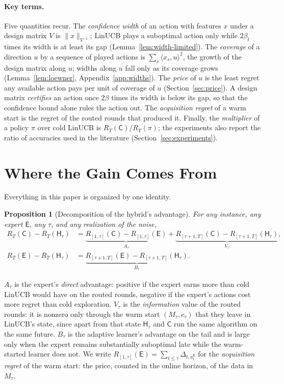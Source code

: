\documentclass{article}
\newtheorem{proposition}{Proposition}
\theoremstyle{definition}
\theoremstyle{remark}
\theoremstyle{remark}
\newcommand{\Cold}{\mathsf{C}}
\newcommand{\Exp}{\mathsf{E}}
\newcommand{\Hyb}{\mathsf{H}}
\begin{document}
\paragraph{Key terms.}
Five quantities recur. The \emph{confidence width} of an action with features
$x$ under a design matrix $V$ is $\|x\|_{V^{-1}}$; LinUCB plays a suboptimal
action only while $2\beta_t$ times its width is at least its gap
(Lemma~\ref{lem:width-limited}). The \emph{coverage} of a direction $u$ by a
sequence of played actions is $\sum_s\langle x_s,u\rangle^2$, the growth of the
design matrix along $u$; widths along $u$ fall only as its coverage grows
(Lemma~\ref{lem:loewner}, Appendix~\ref{app:widths}). The \emph{price} of $u$
is the least regret any available action pays per unit of coverage of $u$
(Section~\ref{sec:price}). A design
matrix \emph{certifies} an action once $2\beta$ times its width is below its
gap, so that the confidence bound alone rules the action out. The
\emph{acquisition regret} of a warm start is the regret of the routed rounds
that produced it. Finally, the \emph{multiplier} of a policy $\pi$ over cold
LinUCB is $R_T(\Cold)/R_T(\pi)$; the experiments also report the ratio of
accuracies used in the literature (Section~\ref{sec:experiments}).


\section{Where the Gain Comes From}
\label{sec:decomp}

Everything in this paper is organized by one identity.

\begin{proposition}[Decomposition of the hybrid's advantage]
\label{prop:decomp}
For any instance, any expert $\Exp$, any $\tau$, and any realization of the
noise,
\begin{align*}
R_T(\Cold)-R_T(\Hyb_\tau)
&=\underbrace{R_{[1,\tau]}(\Cold)-R_{[1,\tau]}(\Exp)}_{A_\tau}
 +\underbrace{R_{[\tau+1,T]}(\Cold)-R_{[\tau+1,T]}(\Hyb_\tau)}_{V_\tau},\\
R_T(\Exp)-R_T(\Hyb_\tau)
&=\underbrace{R_{[\tau+1,T]}(\Exp)-R_{[\tau+1,T]}(\Hyb_\tau)}_{B_\tau}.
\end{align*}
\end{proposition}

$A_\tau$ is the expert's \emph{direct} advantage: positive if the expert earns
more than cold LinUCB would have on the routed rounds, negative if the expert's
actions cost more regret than cold exploration. $V_\tau$ is the
\emph{information} value of the routed rounds: it is nonzero only through the
warm start $(M_\tau,c_\tau)$ that they leave in LinUCB's state, since apart
from that state $\Hyb_\tau$ and $\Cold$ run the same algorithm on the same
future. $B_\tau$ is the adaptive learner's advantage on the tail and is large
only when the expert remains substantially suboptimal late while the
warm-started learner does not. We write $R_{[1,\tau]}(\Exp)=\sum_{t\le\tau}\Delta_{t,a_t^{\Exp}}$
for the \emph{acquisition regret} of the warm start: the price, counted in the
online horizon, of the data in $M_\tau$.
\end{document}
